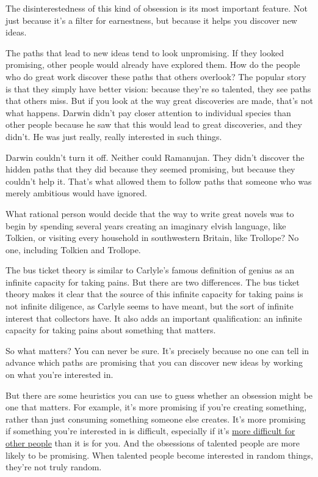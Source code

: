 \documentclass[12pt]{book}
\begin{document}
The disinterestedness of this kind of obsession is its most important
feature. Not just because it's a filter for earnestness, but because it
helps you discover new ideas.

The paths that lead to new ideas tend to look unpromising. If they
looked promising, other people would already have explored them. How do
the people who do great work discover these paths that others overlook?
The popular story is that they simply have better vision: because
they're so talented, they see paths that others miss. But if you look at
the way great discoveries are made, that's not what happens. Darwin
didn't pay closer attention to individual species than other people
because he saw that this would lead to great discoveries, and they
didn't. He was just really, really interested in such things.

Darwin couldn't turn it off. Neither could Ramanujan. They didn't
discover the hidden paths that they did because they seemed promising,
but because they couldn't help it. That's what allowed them to follow
paths that someone who was merely ambitious would have ignored.

What rational person would decide that the way to write great novels was
to begin by spending several years creating an imaginary elvish
language, like Tolkien, or visiting every household in southwestern
Britain, like Trollope? No one, including Tolkien and Trollope.

The bus ticket theory is similar to Carlyle's famous definition of
genius as an infinite capacity for taking pains. But there are two
differences. The bus ticket theory makes it clear that the source of
this infinite capacity for taking pains is not infinite diligence, as
Carlyle seems to have meant, but the sort of infinite interest that
collectors have. It also adds an important qualification: an infinite
capacity for taking pains about something that matters.

So what matters? You can never be sure. It's precisely because no one
can tell in advance which paths are promising that you can discover new
ideas by working on what you're interested in.

But there are some heuristics you can use to guess whether an obsession
might be one that matters. For example, it's more promising if you're
creating something, rather than just consuming something someone else
creates. It's more promising if something you're interested in is
difficult, especially if it's \href{work.html}{more difficult for other
people} than it is for you. And the obsessions of talented people are
more likely to be promising. When talented people become interested in
random things, they're not truly random.
\end{document}
